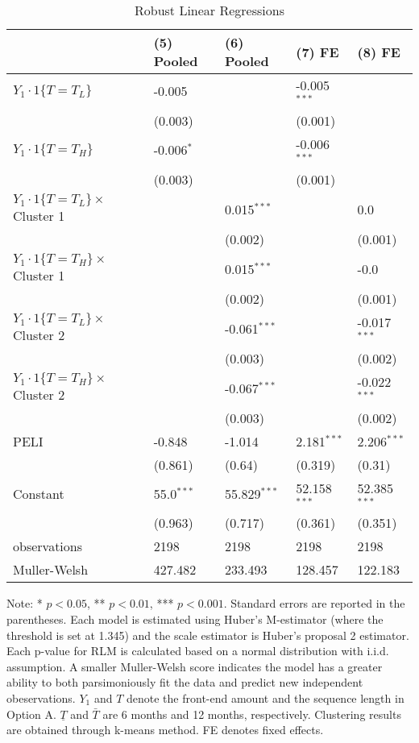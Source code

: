 \documentclass[12pt]{article}
\begin{document}
\begin{table}
    \caption{Robust Linear Regressions}
    \vspace*{12pt}
    \centering

      \begin{tabular}{lllll}
\hline
 & (5) Pooled & (6) Pooled & (7) FE & (8) FE \\
\hline
$Y_1\cdot1\{T=T_L\}$ & -0.005 &  & -0.005$^{***}$ &  \\
 & (0.003) &  & (0.001) &  \\
$Y_1\cdot1\{T=T_H\}$ & -0.006$^{*}$ &  & -0.006$^{***}$ &  \\
 & (0.003) &  & (0.001) &  \\
$Y_1\cdot1\{T=T_L\}\times$ Cluster 1 &  & 0.015$^{***}$ &  & 0.0 \\
 &  & (0.002) &  & (0.001) \\
$Y_1\cdot1\{T=T_H\}\times$ Cluster 1 &  & 0.015$^{***}$ &  & -0.0 \\
 &  & (0.002) &  & (0.001) \\
$Y_1\cdot1\{T=T_L\}\times$ Cluster 2 &  & -0.061$^{***}$ &  & -0.017$^{***}$ \\
 &  & (0.003) &  & (0.002) \\
$Y_1\cdot1\{T=T_H\}\times$ Cluster 2 &  & -0.067$^{***}$ &  & -0.022$^{***}$ \\
 &  & (0.003) &  & (0.002) \\
PELI & -0.848 & -1.014 & 2.181$^{***}$ & 2.206$^{***}$ \\
 & (0.861) & (0.64) & (0.319) & (0.31) \\
Constant & 55.0$^{***}$ & 55.829$^{***}$ & 52.158$^{***}$ & 52.385$^{***}$ \\
 & (0.963) & (0.717) & (0.361) & (0.351) \\\hline

observations & 2198 & 2198 & 2198 & 2198 \\
Muller-Welsh & 427.482 & 233.493 & 128.457 & 122.183 \\
\hline
\end{tabular}

    \vspace*{4pt}
    \centering
    \begin{minipage}{0.85\textwidth}
    {\par\footnotesize Note: * $p<0.05$, ** $p<0.01$, *** $p<0.001$. Standard errors are reported in the parentheses. Each model is estimated using Huber's M-estimator (where the threshold is set at 1.345) and the scale estimator is Huber's proposal 2 estimator. Each p-value for RLM is calculated based on a normal distribution with i.i.d. assumption. A smaller Muller-Welsh score indicates the model has a greater ability to both parsimoniously fit the data and predict new independent obeservations. $Y_1$ and $T$ denote the front-end amount and the sequence length in Option A. $\underline{T}$ and $\bar{T}$ are 6 months and 12 months, respectively. Clustering results are obtained through k-means method. FE denotes fixed effects.}
    \end{minipage}
    \label{tab:seq_value_rlm}
\end{table}
\end{document}
